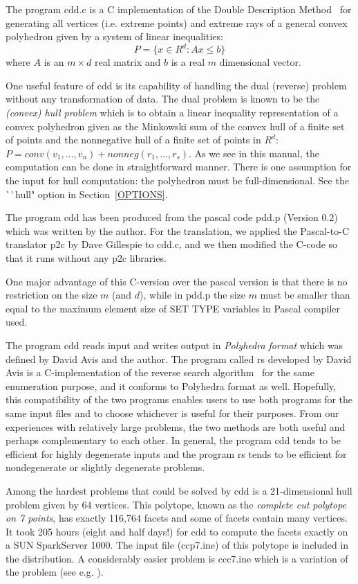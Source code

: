 The program  cdd.c  is a C implementation of 
the Double Description Method~\cite{MRTT}
for generating all vertices (i.e. extreme points)
and extreme rays of a general 
convex polyhedron given by a system of linear inequalities:
\[
   P = \{ x  \in R^d:  A  x  \le  b \}
\]
where $A$ is an $m \times d$ real matrix and $b$ is a real
$m$ dimensional vector.

One useful feature of cdd is its capability
of handling the dual (reverse)  problem without any transformation
of data.  The dual problem is known to be the 
{\em (convex) hull problem\/} which
is to obtain a linear inequality representation
of a convex polyhedron given as the Minkowski sum of 
the convex hull of a finite set of points and the nonnegative
hull of a finite set of points in $R^d$: 
$P = conv(v_1,\ldots,v_n) +  nonneg(r_1,\ldots,r_s)$.
As we see in this manual, the computation can be done
in straightforward manner.  There is one assumption for the input
for hull computation: the polyhedron must be full-dimensional.
See the ^^ ^^ hull" option in Section~\ref{OPTIONS}.

The program cdd has been produced
from the pascal code pdd.p (Version 0.2)
which was written by the author.   For the translation,
we applied the Pascal-to-C translator p2c
by Dave Gillespie to cdd.c, and we then modified
the C-code so that it runs without any p2c libraries.

One major advantage of this C-version over the pascal version is
that there is no restriction on the size  $m$ (and $d$), while in pdd.p
the size $m$ must be smaller than equal to the maximum element size
of SET TYPE variables in Pascal compiler used.

The program cdd reads input and writes output in 
{\em Polyhedra format\/} which was defined by David Avis and
the author.  The program called rs developed by David Avis is
a C-implementation of the reverse search algorithm~\cite{AF} 
for the same enumeration purpose, and it conforms to Polyhedra format as well.
Hopefully, this compatibility of the two programs
enables users to use both programs for the same input files
and to choose whichever is useful for their purposes.
From our experiences with relatively large problems,
the two methods are both useful and perhaps complementary
to each other.  In general, the program cdd tends to be
efficient for highly degenerate inputs and the program rs
tends to be efficient for nondegenerate or slightly
degenerate problems.

Among the hardest problems that could be
solved by cdd is a 21-dimensional hull problem given by 64 
vertices. This polytope, known as the {\em complete
cut polytope on 7 points\/}, has exactly 116,764 facets
and some of facets contain many vertices. 
It took 205 hours (eight and half days!) for cdd
to compute the facets exactly on a SUN SparkServer 1000.
The input file (ccp7.ine) of this polytope is
included in the distribution.  A considerably easier
problem is ccc7.ine which is a variation of the problem 
(see e.g. \cite{G}).

